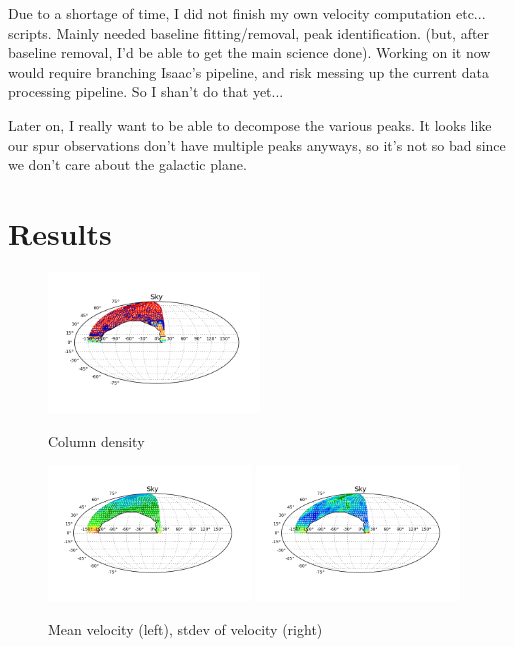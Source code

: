 \documentclass[10pt]{article}
\begin{document}
Due to a shortage of time, I did not finish my own
velocity computation etc... scripts.  Mainly needed baseline fitting/removal, peak identification.  (but, after baseline removal, I'd be able to get the main science done).  Working on it now would require branching Isaac's pipeline, and risk messing up the current data processing pipeline.  So I shan't do that yet...

Later on, I really want to be able to decompose the various peaks.  It
looks like our spur observations don't have multiple peaks anyways, so it's not
so bad since we don't care about the galactic plane.

\section{Results}

\begin{figure}[!ht]
    \centering
    \includegraphics[width=0.5\textwidth]{plots/col_density.png} \\
    \caption{Column density}
    \label{fig:colrho}
\end{figure}
\begin{figure}[!ht]
    \centering
    \includegraphics[width=0.48\textwidth]{plots/veloc_mean.png}
    \includegraphics[width=0.48\textwidth]{plots/veloc_std.png} \\
    \caption{Mean velocity (left), stdev of velocity (right)}
    \label{fig:velocs}
\end{figure}
\end{document}
